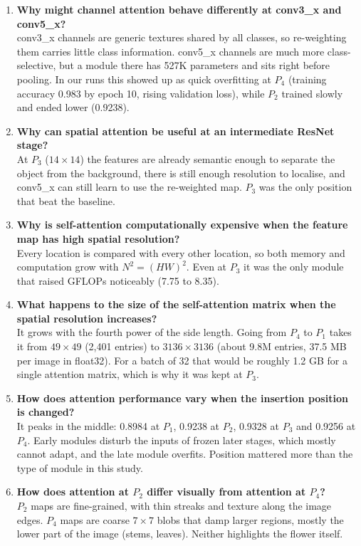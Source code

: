 \documentclass[10pt]{article}
\begin{document}
\begin{enumerate}
\item \textbf{Why might channel attention behave differently at conv3\_x and conv5\_x?}\\
conv3\_x channels are generic textures shared by all classes, so
re-weighting them carries little class information. conv5\_x channels are much
more class-selective, but a module there has 527K parameters and sits right
before pooling. In our runs this showed up as quick overfitting at $P_4$
(training accuracy 0.983 by epoch 10, rising validation loss), while $P_2$ trained
slowly and ended lower (0.9238).

\item \textbf{Why can spatial attention be useful at an intermediate ResNet stage?}\\
At $P_3$ ($14\times14$) the features are already semantic enough to
separate the object from the background, there is still enough resolution to
localise, and conv5\_x can still learn to use the re-weighted map. $P_3$ was the
only position that beat the baseline.

\item \textbf{Why is self-attention computationally expensive when the feature map has high spatial resolution?}\\
Every location is compared with every other location, so both memory and
computation grow with $N^2=(HW)^2$. Even at $P_3$ it was the only module that
raised GFLOPs noticeably (7.75 to 8.35).

\item \textbf{What happens to the size of the self-attention matrix when the spatial resolution increases?}\\
It grows with the fourth power of the side length. Going from $P_4$ to
$P_1$ takes it from $49\times49$ (2{,}401 entries) to $3136\times3136$ (about
9.8M entries, 37.5 MB per image in float32). For a batch of 32 that would be
roughly 1.2 GB for a single attention matrix, which is why it was kept at
$P_3$.

\item \textbf{How does attention performance vary when the insertion position is changed?}\\
It peaks in the middle: 0.8984 at $P_1$, 0.9238 at $P_2$, 0.9328 at $P_3$
and 0.9256 at $P_4$. Early modules disturb the inputs of frozen later stages,
which mostly cannot adapt, and the late module overfits. Position mattered more
than the type of module in this study.

\item \textbf{How does attention at $P_2$ differ visually from attention at $P_4$?}\\
$P_2$ maps are fine-grained, with thin streaks and texture along the image
edges. $P_4$ maps are coarse $7\times7$ blobs that damp larger regions, mostly
the lower part of the image (stems, leaves). Neither highlights the flower
itself.


\end{enumerate}
\end{document}
